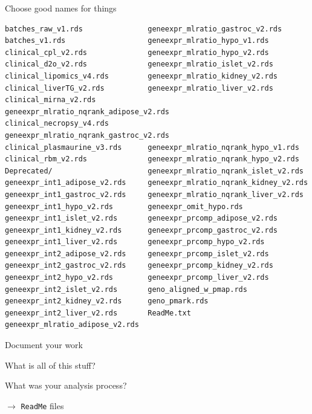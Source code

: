 \documentclass[aspectratio=169,12pt,t]{beamer}
\begin{document}
\begin{frame}[fragile,c]{Choose good names for things}


\begin{center}
\begin{minipage}[c]{9.5cm}
\begin{semiverbatim}
\lstset{basicstyle=\tiny}
\begin{lstlisting}[escapechar=!,linewidth=9.5cm]
batches_raw_v1.rds               geneexpr_mlratio_gastroc_v2.rds
batches_v1.rds                   geneexpr_mlratio_hypo_v1.rds
clinical_cpl_v2.rds              geneexpr_mlratio_hypo_v2.rds
clinical_d2o_v2.rds              geneexpr_mlratio_islet_v2.rds
clinical_lipomics_v4.rds         geneexpr_mlratio_kidney_v2.rds
clinical_liverTG_v2.rds          geneexpr_mlratio_liver_v2.rds
clinical_mirna_v2.rds            geneexpr_mlratio_nqrank_adipose_v2.rds
clinical_necropsy_v4.rds         geneexpr_mlratio_nqrank_gastroc_v2.rds
clinical_plasmaurine_v3.rds      geneexpr_mlratio_nqrank_hypo_v1.rds
clinical_rbm_v2.rds              geneexpr_mlratio_nqrank_hypo_v2.rds
Deprecated/                      geneexpr_mlratio_nqrank_islet_v2.rds
geneexpr_int1_adipose_v2.rds     geneexpr_mlratio_nqrank_kidney_v2.rds
geneexpr_int1_gastroc_v2.rds     geneexpr_mlratio_nqrank_liver_v2.rds
geneexpr_int1_hypo_v2.rds        geneexpr_omit_hypo.rds
geneexpr_int1_islet_v2.rds       geneexpr_prcomp_adipose_v2.rds
geneexpr_int1_kidney_v2.rds      geneexpr_prcomp_gastroc_v2.rds
geneexpr_int1_liver_v2.rds       geneexpr_prcomp_hypo_v2.rds
geneexpr_int2_adipose_v2.rds     geneexpr_prcomp_islet_v2.rds
geneexpr_int2_gastroc_v2.rds     geneexpr_prcomp_kidney_v2.rds
geneexpr_int2_hypo_v2.rds        geneexpr_prcomp_liver_v2.rds
geneexpr_int2_islet_v2.rds       geno_aligned_w_pmap.rds
geneexpr_int2_kidney_v2.rds      geno_pmark.rds
geneexpr_int2_liver_v2.rds       ReadMe.txt
geneexpr_mlratio_adipose_v2.rds
\end{lstlisting}
\end{semiverbatim}
\end{minipage}
\end{center}

\end{frame}



\begin{frame}[c]{Document your work}

  \bbi
\item What is all of this stuff?
\item What was your analysis process?
\vspace{1cm}
\item[$\boldsymbol{\rightarrow}$] {\large {\tt ReadMe} files}
  \ei

\end{frame}
\end{document}
